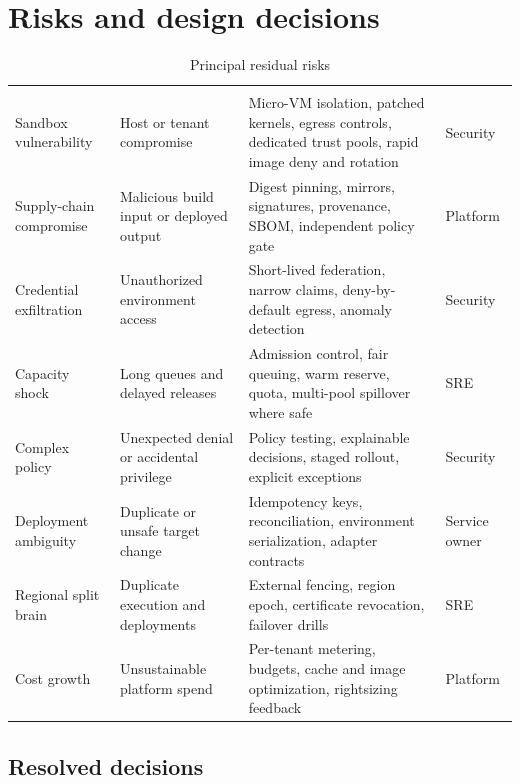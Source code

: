 \section{Risks and design decisions}

\begin{longtable}{@{}L{0.20\textwidth}L{0.29\textwidth}L{0.33\textwidth}L{0.09\textwidth}@{}}
\caption{Principal residual risks}\label{tab:risks}\\
\toprule
{} &  &  &  \\
\midrule
\endfirsthead
\toprule
{} &  &  &  \\
\midrule
\endhead
Sandbox vulnerability & Host or tenant compromise & Micro-VM isolation, patched kernels, egress controls, dedicated trust pools, rapid image deny and rotation & Security \\
Supply-chain compromise & Malicious build input or deployed output & Digest pinning, mirrors, signatures, provenance, SBOM, independent policy gate & Platform \\
Credential exfiltration & Unauthorized environment access & Short-lived federation, narrow claims, deny-by-default egress, anomaly detection & Security \\
Capacity shock & Long queues and delayed releases & Admission control, fair queuing, warm reserve, quota, multi-pool spillover where safe & SRE \\
Complex policy & Unexpected denial or accidental privilege & Policy testing, explainable decisions, staged rollout, explicit exceptions & Security \\
Deployment ambiguity & Duplicate or unsafe target change & Idempotency keys, reconciliation, environment serialization, adapter contracts & Service owner \\
Regional split brain & Duplicate execution and deployments & External fencing, region epoch, certificate revocation, failover drills & SRE \\
Cost growth & Unsustainable platform spend & Per-tenant metering, budgets, cache and image optimization, rightsizing feedback & Platform \\
\bottomrule
\end{longtable}

\subsection{Resolved decisions}

